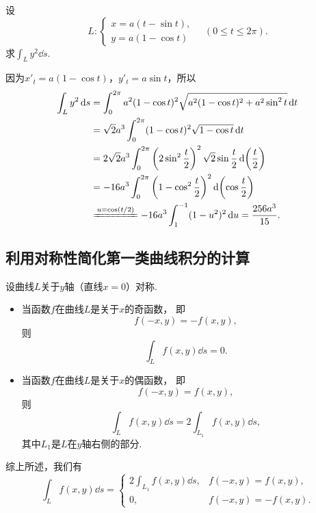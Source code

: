 \begin{example}
设\begin{equation*}
	L: \left\{ \begin{array}{l}
		x = a(t - \sin t), \\
		y = a(1 - \cos t)
	\end{array} \right.
	\quad(0 \leq t \leq 2\pi).
\end{equation*}
求\(\int_L y^2 \dd{s}\).
\begin{solution}
因为\(x'_t = a(1 - \cos t)\)，\(y'_t = a \sin t\)，所以\begin{align*}
	\int_L y^2 \dd{s}
	&= \int_0^{2\pi} a^2(1 - \cos t)^2 \sqrt{a^2(1 - \cos t)^2 + a^2 \sin^2 t} \dd{t} \\
	&= \sqrt{2} a^3 \int_0^{2\pi} (1 - \cos t)^2 \sqrt{1 - \cos t} \dd{t} \\
	&= 2\sqrt{2} a^3 \int_0^{2\pi}
		\left(2 \sin^2 \frac{t}{2}\right)^2 \sqrt{2} \sin\frac{t}{2} \dd(\frac{t}{2}) \\
	&= -16 a^3 \int_0^{2\pi} \left(1 - \cos^2 \frac{t}{2}\right)^2 \dd(\cos\frac{t}{2}) \\
	&\xlongequal{u=\cos(t/2)}
	-16a^3 \int_1^{-1} (1-u^2)^2 \dd{u}
	= \frac{256a^3}{15}.
\end{align*}
\end{solution}
\end{example}

\subsection{利用对称性简化第一类曲线积分的计算}

设曲线\(L\)关于\(y\)轴（直线\(x=0\)）对称.
\begin{itemize}
	\item 当函数\(f\)在曲线\(L\)是关于\(x\)的奇函数，
	即\begin{equation*}
		f(-x,y) = -f(x,y),
	\end{equation*}
	则\begin{equation*}
		\int_L f(x,y) \dd{s} = 0.
	\end{equation*}

	\item 当函数\(f\)在曲线\(L\)是关于\(x\)的偶函数，
	即\begin{equation*}
		f(-x,y) = f(x,y),
	\end{equation*}
	则\begin{equation*}
		\int_L f(x,y) \dd{s}
		= 2 \int_{L_1} f(x,y) \dd{s},
	\end{equation*}
	其中\(L_1\)是\(L\)在\(y\)轴右侧的部分.
\end{itemize}
综上所述，我们有\begin{equation*}
	\int_L f(x,y) \dd{s}
	= \left\{ \begin{array}{cc}
		2 \int_{L_1} f(x,y) \dd{s}, & f(-x,y) = f(x,y), \\
		0, & f(-x,y) = -f(x,y).
	\end{array} \right.
\end{equation*}

